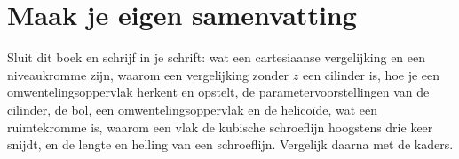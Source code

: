 
\ifzelfstudie
\section*{Maak je eigen samenvatting}
Sluit dit boek en schrijf in je schrift: wat een cartesiaanse vergelijking en een niveaukromme zijn, waarom een vergelijking zonder $z$ een cilinder is, hoe je een omwentelingsoppervlak herkent en opstelt, de parametervoorstellingen van de cilinder, de bol, een omwentelingsoppervlak en de helicoïde, wat een ruimtekromme is, waarom een vlak de kubische schroeflijn hoogstens drie keer snijdt, en de lengte en helling van een schroeflijn. Vergelijk daarna met de kaders.
\fi
